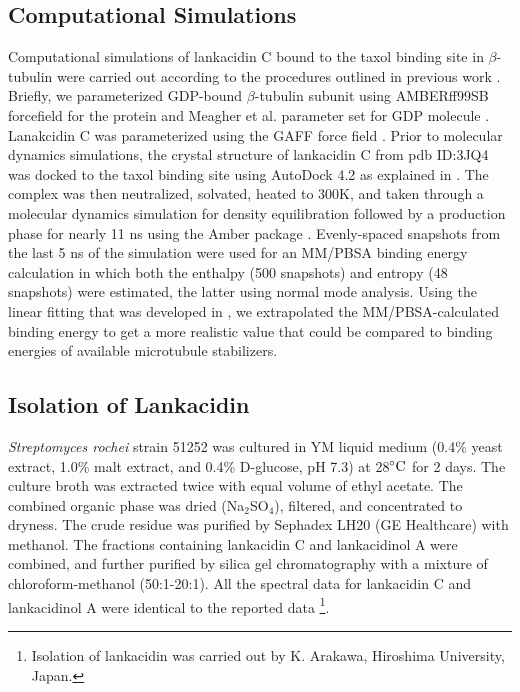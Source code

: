 \documentclass[11pt]{report}
\begin{document}
\subsection{Computational Simulations}
Computational simulations of lankacidin C
bound to the taxol binding site in $\beta$-tubulin
were carried out according to the procedures outlined
in previous work \cite{Ayoub2013}. 
Briefly, we parameterized GDP-bound $\beta$-tubulin
subunit using AMBERff99SB forcefield for the protein
\cite{Hornak2006}
and Meagher et al. parameter set for GDP molecule
\cite{Meagher2003}.
Lanakcidin C was parameterized using the GAFF force field \cite{Wang2004}.
Prior to molecular dynamics simulations, the crystal structure
of lankacidin C from \gls{pdb} ID:3JQ4
was docked to the taxol binding site using AutoDock 4.2
as explained in \cite{Ayoub2013}. The complex was then 
neutralized, solvated, heated to 300K, and taken through a molecular dynamics
simulation for density equilibration followed by a production phase for
nearly 11 ns using the Amber package \cite{case2012}. Evenly-spaced
snapshots from the last 5 ns of the simulation were used for
an MM/PBSA binding energy calculation in which 
both the enthalpy (500 snapshots) and entropy (48 snapshots) were estimated, the latter using
normal mode analysis. Using the linear fitting that was developed
in \cite{Ayoub2013}, we extrapolated the MM/PBSA-calculated binding energy
to get a more realistic value that could be compared to binding energies 
of available 
microtubule stabilizers.

\subsection{Isolation of Lankacidin} \emph{Streptomyces rochei} strain 51252 \cite{Kinashi1994} was cultured in YM liquid medium 
(0.4\% yeast extract, 1.0\% malt extract, and 0.4\% D-glucose, pH 7.3) at 28$\celsius$
for 2 days. 
The culture broth was extracted twice with equal volume of ethyl acetate. 
The combined organic phase was dried (Na$_{2}$SO$_{4}$), filtered, and 
concentrated to dryness. The crude residue was purified by Sephadex LH20 
(GE Healthcare) with methanol. The fractions containing lankacidin C and 
lankacidinol A were combined, and further purified by silica gel chromatography 
with a mixture of chloroform-methanol (50:1-20:1). All the spectral data for 
lankacidin C and lankacidinol A were identical to the reported data \cite{Arakawa2005} \footnote{Isolation of lankacidin was carried out by 
K. Arakawa, Hiroshima University, Japan.}.
\end{document}
